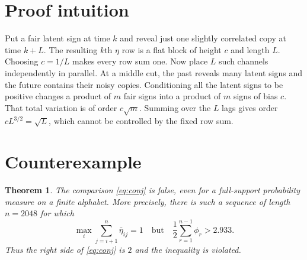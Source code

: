\documentclass[11pt]{article}
\newtheorem{theorem}{Theorem}
\begin{document}
\section{Proof intuition}

Put a fair latent sign at time $k$ and reveal just one slightly correlated
copy at time $k+L$.  The resulting $k$th $\eta$ row is a flat block of height
$c$ and length $L$.  Choosing $c=1/L$ makes every row sum one.  Now place
$L$ such channels independently in parallel.  At a middle cut, the past
reveals many latent signs and the future contains their noisy copies.
Conditioning all the latent signs to be positive changes a product of $m$
fair signs into a product of $m$ signs of bias $c$.  That total variation is
of order $c\sqrt m$.  Summing over the $L$ lags gives order
$cL^{3/2}=\sqrt L$, which cannot be controlled by the fixed row sum.

\section{Counterexample}

\begin{theorem}\label{thm:main}
The comparison \eqref{eq:conj} is false, even for a full-support probability
measure on a finite alphabet.  More precisely, there is such a sequence of
length $n=2048$ for which
\[
 \max_i\sum_{j=i+1}^n\bar\eta_{ij}=1
 \quad\text{but}\quad
 \frac12\sum_{r=1}^{n-1}\phi_r>2.933.
\]
Thus the right side of \eqref{eq:conj} is $2$ and the inequality is violated.
\end{theorem}
\end{document}
